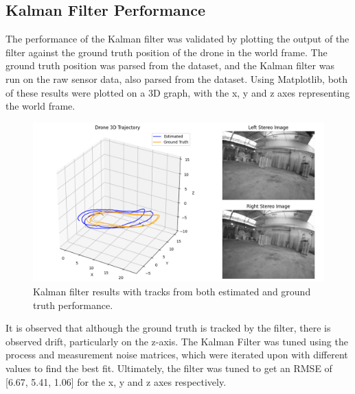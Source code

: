 \documentclass[bare_jrnl_transmag]{subfiles}
\begin{document}
\subsection{Kalman Filter Performance}
The performance of the Kalman filter was validated by plotting the output of the filter against the ground truth position of the drone in the world frame. The ground truth position was parsed from the dataset, and the Kalman filter was run on the raw sensor data, also parsed from the dataset. Using Matplotlib, both of these results were plotted on a 3D graph, with the x, y and z axes representing the world frame.

\begin{figure}[H]
    \centering
    \includegraphics[width=0.8\linewidth]{figures/kf_results.png}
    \caption{Kalman filter results with tracks from both estimated and ground truth performance.}
    \label{fig:kalman_results}
\end{figure}

It is observed that although the ground truth is tracked by the filter, there is observed drift, particularly on the z-axis. The Kalman Filter was tuned using the process and measurement noise matrices, which were iterated upon with different values to find the best fit. Ultimately, the filter was tuned to get an RMSE of [6.67, 5.41, 1.06] for the x, y and z axes respectively.
\end{document}

